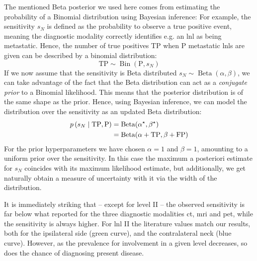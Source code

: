 \documentclass[\relativeRoot/main.tex]{subfiles}
\begin{document}
\begin{tcolorbox}[
    title=\faIcon{lightbulb} Beta posterior,
    parbox=false,
    float
] \label{box:dataset_clb:results:beta}
    The mentioned Beta posterior we used here comes from estimating the probability of a Binomial distribution using Bayesian inference: For example, the sensitivity $s_N$ is defined as the probability to observe a true positive event, meaning the diagnostic modality correctly identifies e.g. an \gls{lnl} as being metastatic. Hence, the number of true positives TP when P metastatic \glspl{lnl} are given can be described by a binomial distribution:
    \begin{equation}
        \text{TP} \sim \operatorname{Bin}(\text{P}, s_N)
    \end{equation}
    If we now assume that the sensitivity is Beta distributed $s_N \sim \operatorname{Beta}(\alpha, \beta)$, we can take advantage of the fact that the Beta distribution can act as a \emph{conjugate prior} to a Binomial likelihood. This means that the posterior distribution is of the same shape as the prior. Hence, using Bayesian inference, we can model the distribution over the sensitivity as an updated Beta distribution:
    \begin{equation}
        \begin{aligned}
            p \left( s_N \mid \text{TP},\text{P} \right) &= \operatorname{Beta}(\alpha^\star, \beta^\star) \\
            &= \operatorname{Beta}(\alpha + \text{TP}, \beta + \text{FP})
        \end{aligned}
    \end{equation}
    For the prior hyperparameters we have chosen $\alpha=1$ and $\beta=1$, amounting to a uniform prior over the sensitivity. In this case the maximum a posteriori estimate for $s_N$ coincides with its maximum likelihood estimate, but additionally, we get naturally obtain a measure of uncertainty with it via the width of the distribution.

\end{tcolorbox}

It is immediately striking that -- except for level II -- the observed sensitivity is far below what  reported for the three diagnostic modalities \gls{ct}, \gls{mri} and \gls{pet}, while the sensitivity is always higher. For \gls{lnl} II the literature values match our results, both for the ipsilateral side (green curve), and the contralateral neck (blue curve). However, as the prevalence for involvement in a given level decreases, so does the chance of diagnosing present disease.
\end{document}

